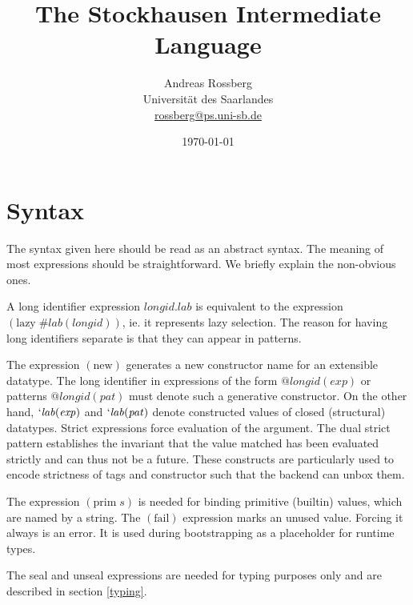 \documentclass[twoside]{article}
\newcommand{\x}[1]{\mathit{#1}}
\newcommand{\f}[1]{\mbox{#1}}
\newcommand{\lab}{\x{lab}}
\newcommand{\longid}{\x{longid}}
\renewcommand{\exp}{\x{exp}}
\newcommand{\pat}{\x{pat}}
\begin{document}

\title{The Stockhausen Intermediate Language}
\author{Andreas Rossberg \\
Universit\"at des Saarlandes \\
\url{rossberg@ps.uni-sb.de}}
\date{\today}

\maketitle


\section{Syntax}
\label{syntax}

The syntax given here should be read as an abstract syntax. The meaning of most expressions should be straightforward. We briefly explain the non-obvious ones.

A long identifier expression $\longid.\lab$ is equivalent to the expression $(\f{lazy}\; \#\lab(\longid))$, ie. it represents lazy selection. The reason for having long identifiers separate is that they can appear in patterns.

The expression $(\f{new})$ generates a new constructor name for an extensible datatype. The long identifier in expressions of the form $@\longid(\exp)$ or patterns $@\longid(\pat)$ must denote such a generative constructor. On the other hand, $`\lab(\exp)$ and $`\lab(\pat)$ denote constructed values of closed (structural) datatypes. Strict expressions force evaluation of the argument. The dual strict pattern establishes the invariant that the value matched has been evaluated strictly and can thus not be a future. These constructs are particularly used to encode strictness of tags and constructor such that the backend can unbox them.

The expression $(\f{prim}\;s)$ is needed for binding primitive (builtin) values, which are named by a string. The $(\f{fail})$ expression marks an unused value. Forcing it always is an error. It is used during bootstrapping as a placeholder for runtime types.

The \f{seal} and \f{unseal} expressions are needed for typing purposes only and are described in section \ref{typing}.
\end{document}
